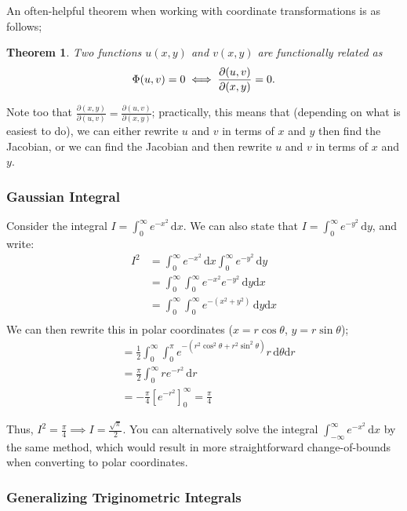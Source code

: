 \documentclass[12pt]{article}
\newtheorem*{theorem}{Theorem}
\begin{document}
{An often-helpful theorem when working with coordinate transformations is as follows;
\begin{theorem}
    Two functions $u(x,y)$ and $v(x,y)$ are functionally related as \[\Phi(u, v) = 0 \iff \frac{\partial (u,v)}{\partial (x,y)} = 0.\]
\end{theorem}

Note too that $\frac{\partial(x,y)}{\partial(u,v)} = \frac{\partial(u,v)}{\partial(x,y)}$; practically, this means that (depending on what is easiest to do), we can either rewrite $u$ and $v$ in terms of $x$ and $y$ then find the Jacobian, or we can find the Jacobian and then rewrite $u$ and $v$ in terms of $x$ and $y$.
\subsubsection{Gaussian Integral}

Consider the integral $I = \int_0^{\infty} e^{-x^2} \,\text{d}x$. We can also state that $I = \int_{0}^{\infty} e^{-y^2} \,\text{d}y$, and write: \begin{align*}
    I^2 &= \int_{0}^{\infty} e^{-x^2} \, \text{d}x \int_{0}^{\infty} e^{-y^2} \,\text{d}y\\
    &= \int_{0}^{\infty}\int_{0}^{\infty} e^{-x^2} e^{-y^2} \, \text{d}y\text{d}x\\
    &= \int_{0}^{\infty}\int_{0}^{\infty} e^{-(x^2+y^2)}\, \text{d}y\text{d}x\\
\end{align*}
We can then rewrite this in polar coordinates ($x = r\cos \theta$, $y = r\sin\theta$);
\begin{align*}
    &= \frac{1}{2}\int_{0}^{\infty}\int_{0}^{\pi} e^{-(r^2\cos^2 \theta+r^2\sin^2\theta)} r\, \text{d}\theta\text{d}r\\
    &= \frac{\pi}{2} \int_{0}^{\infty}r e^{-r^2} \,\text{d}r\\
    &= -\frac{\pi}{4}\left[e^{-r^2}\right]_0^{\infty} = \frac{\pi}{4}
\end{align*}

Thus, $I^2 = \frac{\pi}{4} \implies I = \frac{\sqrt{\pi}}{2}.$ You can alternatively solve the integral $\int_{-\infty}^{\infty} e^{-x^2}\,\text{d}x$ by the same method, which would result in more straightforward change-of-bounds when converting to polar coordinates.

\subsubsection{Generalizing Triginometric Integrals}\label{sec:generalizing_trig_integrals}

}
\end{document}

